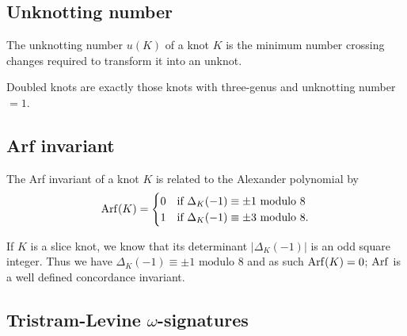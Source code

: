 \subsection{Unknotting number}

\begin{definition}
	The unknotting number $u(K)$ of a knot $K$
	is the minimum number crossing changes required
	to transform it into an unknot.
\end{definition}


\begin{proposition}
	Doubled knots are exactly those knots
	with three-genus and unknotting number $=1$.
\end{proposition}



\subsection{Arf invariant}

\begin{theorem}
	The Arf invariant of a knot $K$ is related to the Alexander polynomial by
	\begin{equation*}
		\operatorname{Arf}(K) =
		\begin{cases}
			0 & \textrm{if } \Delta_{K}(-1) \equiv \pm 1 \textrm{ modulo } 8 \\
			1 & \textrm{if } \Delta_{K}(-1) \equiv \pm 3 \textrm{ modulo } 8.
		\end{cases}
	\end{equation*}
\end{theorem}

\begin{remark}
	If $K$ is a slice knot, we know that its determinant
	$| \Delta_{K}(-1) |$ is an odd square integer.
	Thus we have $\Delta_{K}(-1) \equiv \pm 1 \textrm{ modulo } 8$
	and as such $\operatorname{Arf}(K) = 0$; $\operatorname{Arf}$ is a well defined concordance invariant.
\end{remark}


\subsection{Tristram-Levine $\omega$-signatures}

